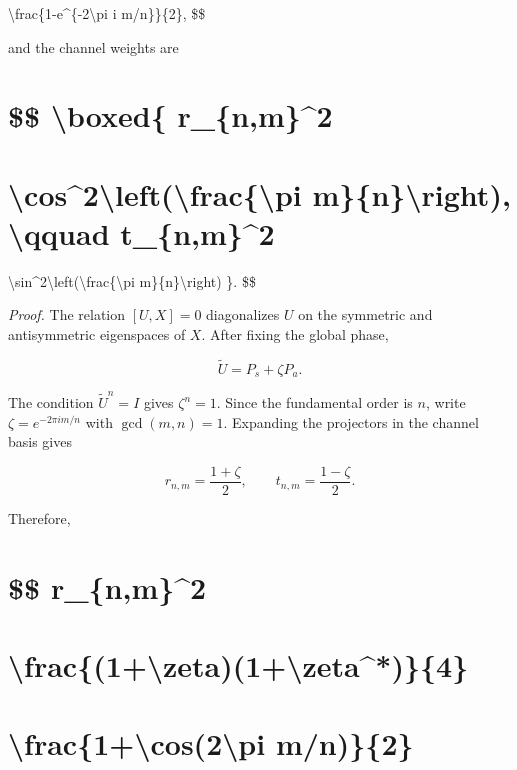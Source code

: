 \documentclass[
  a4paper,
  10pt]{article}
\begin{document}
\textbackslash frac\{1-e\^{}\{-2\textbackslash pi i m/n\}\}\{2\}, \$\$

and the channel weights are

\section{\$\$ \textbackslash boxed\{
\textbar r\_\{n,m\}\textbar\^{}2}\label{-boxed-r_nm2}

\section{\textbackslash cos\^{}2\textbackslash left(\textbackslash frac\{\textbackslash pi
m\}\{n\}\textbackslash right), \textbackslash qquad
\textbar t\_\{n,m\}\textbar\^{}2}\label{cos2leftfracpi-mnright-qquad-t_nm2}

\textbackslash sin\^{}2\textbackslash left(\textbackslash frac\{\textbackslash pi
m\}\{n\}\textbackslash right) \}. \$\$

\emph{Proof.} The relation \([U,X]=0\) diagonalizes \(U\) on the
symmetric and antisymmetric eigenspaces of \(X\). After fixing the
global phase,

\[
\widetilde U=P_s+\zeta P_a.
\]

The condition \(\widetilde U^n=I\) gives \(\zeta^n=1\). Since the
fundamental order is \(n\), write \(\zeta=e^{-2\pi im/n}\) with
\(\gcd(m,n)=1\). Expanding the projectors in the channel basis gives

\[
r_{n,m}=\frac{1+\zeta}{2},
\qquad
t_{n,m}=\frac{1-\zeta}{2}.
\]

Therefore,

\section{\$\$ \textbar r\_\{n,m\}\textbar\^{}2}\label{-r_nm2}

\section{\textbackslash frac\{(1+\textbackslash zeta)(1+\textbackslash zeta\^{}*)\}\{4\}}\label{frac1zeta1zeta4}

\section{\textbackslash frac\{1+\textbackslash cos(2\textbackslash pi
m/n)\}\{2\}}\label{frac1cos2pi-mn2}
\end{document}
